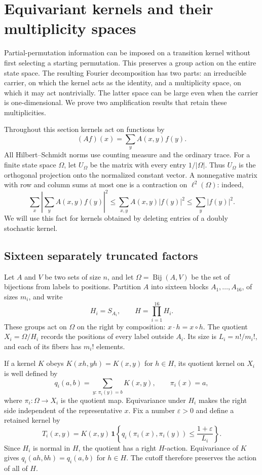 \section{Equivariant kernels and their multiplicity spaces}
\label{l:equivariant-section}

Partial-permutation information can be imposed on a transition kernel
without first selecting a starting permutation.  This preserves a group
action on the entire state space.  The resulting Fourier decomposition
has two parts: an irreducible carrier, on which the kernel acts as the
identity, and a multiplicity space, on which it may act nontrivially.
The latter space can be large even when the carrier is one-dimensional.
We prove two amplification results that retain these multiplicities.

Throughout this section kernels act on functions by
\[
 (Af)(x)=\sum_y A(x,y)f(y).
\]
All Hilbert--Schmidt norms use counting measure and the ordinary trace.
For a finite state space $\Omega$, let $U_\Omega$ be the matrix with
every entry $1/|\Omega|$.  Thus $U_\Omega$ is the orthogonal projection
onto the normalized constant vector.  A nonnegative matrix with row and
column sums at most one is a contraction on $\ell^2(\Omega)$: indeed,
\[
 \sum_x\left|\sum_y A(x,y)f(y)\right|^2
 \le \sum_{x,y}A(x,y)|f(y)|^2\le\sum_y|f(y)|^2.
\]
We will use this fact for kernels obtained by deleting entries of a
doubly stochastic kernel.

\subsection{Sixteen separately truncated factors}

Let $A$ and $V$ be two sets of size $n$, and let
$\Omega=\operatorname{Bij}(A,V)$ be the set of bijections from labels
to positions.  Partition $A$ into sixteen blocks $A_1,\ldots,A_{16}$,
of sizes $m_i$, and write
\[
 H_i=S_{A_i},\qquad H=\prod_{i=1}^{16}H_i.
\]
These groups act on $\Omega$ on the right by composition:
$x\cdot h=x\circ h$.  The quotient $X_i=\Omega/H_i$ records the
positions of every label outside $A_i$.  Its size is
$L_i=n!/m_i!$, and each of its fibers has $m_i!$ elements.

If a kernel $K$ obeys $K(xh,yh)=K(x,y)$ for $h\in H$, its quotient
kernel on $X_i$ is well defined by
\[
 q_i(a,b)=\sum_{y:\,\pi_i(y)=b}K(x,y),\qquad \pi_i(x)=a,
\]
where $\pi_i:\Omega\to X_i$ is the quotient map.  Equivariance under
$H_i$ makes the right side independent of the representative $x$.
Fix a number $\varepsilon>0$ and define a retained kernel by
\begin{equation}
 T_i(x,y)=K(x,y)\,
 \mathbf1\left\{q_i(\pi_i(x),\pi_i(y))
                         \le\frac{1+\varepsilon}{L_i}\right\}.
 \label{l:sixteen-cutoff}
\end{equation}
Since $H_i$ is normal in $H$, the quotient has a right $H$-action.
Equivariance of $K$ gives $q_i(ah,bh)=q_i(a,b)$ for $h\in H$.
The cutoff therefore preserves the action of all of $H$.

